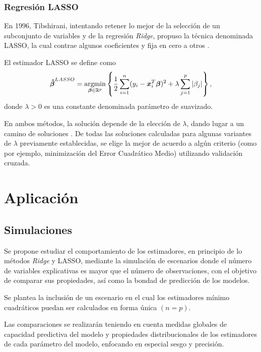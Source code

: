 \documentclass[a4paper,12pt]{article}
\begin{document}
\subsubsection*{Regresión LASSO}
En 1996, Tibshirani, intentando retener lo mejor de la selección de un subconjunto de variables y de la regresión \textit{Ridge}, propuso la técnica denominada LASSO, la cual contrae algunos coeficientes y fija en cero a otros \citep{tibshirani1996regression} \citep{tibshirani2013lasso}.

El estimador LASSO se define como
\begin{equation}
\label{BETA_LASSO}
\boldsymbol{\hat{\beta}}^{LASSO}=\operatornamewithlimits{argmin}\limits_{\boldsymbol{\beta} \in \mathbb{R}^p} \left\{ \frac{1}{2} \sum_{i=1}^n (y_i-\boldsymbol{x}_i^T\boldsymbol{\beta})^2+\lambda \sum_{j=1}^p |\beta_j| \right\},
\end{equation}
donde $\lambda > 0$ es una constante denominada parámetro de suavizado.

\vspace{1.5cm}

En ambos métodos, la solución depende de la elección de $\lambda$, dando lugar a un camino de soluciones \citep{osborne2000new} \citep{efron2004least} \citep{tibshirani2011solution}. De todas las soluciones calculadas para algunas variantes de $\lambda$ previamente establecidas, se elige la mejor de acuerdo a algún criterio (como por ejemplo, minimización del Error Cuadrático Medio) utilizando validación cruzada.

\section{Aplicación}
\subsection{Simulaciones}
Se propone estudiar el comportamiento de los estimadores, en principio de lo métodos \textit{Ridge} y LASSO, mediante la simulación de escenarios donde el número de variables explicativas es mayor que el número de observaciones, con el objetivo de comparar sus propiedades, así como la bondad de predicción de los modelos. 

Se plantea la inclusión de un escenario en el cual los estimadores mínimo cuadráticos puedan ser calculados en forma única $(n=p)$.

Las comparaciones se realizarán teniendo en cuenta medidas globales de capacidad predictiva del modelo y propiedades distribucionales de los estimadores de cada parámetro del modelo, enfocando en especial sesgo y precisión.
\end{document}

